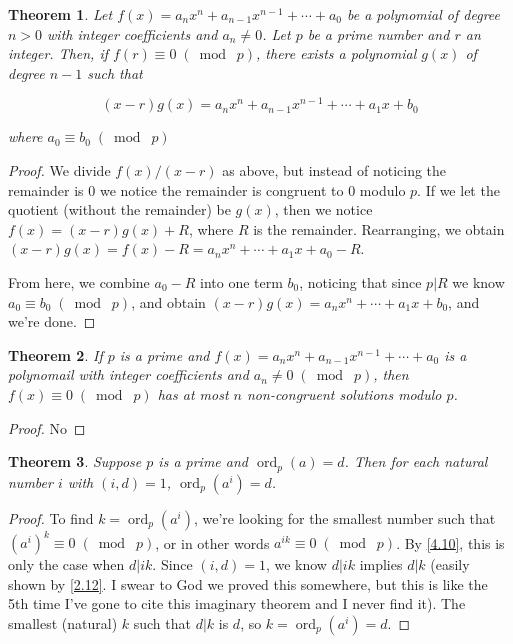 \documentclass{article}
\DeclareMathOperator{\ord}{ord}
\newtheorem{thm}{Theorem}[section]
\numberwithin{equation}{thm}
\providecommand{\gmod}[1]{\; (\bmod \; #1)}
\begin{document}
\begin{thm} \label{6.2}
  Let $f(x) = a_n x^n + a_{n-1} x^{n-1} + \cdots + a_0$ be a polynomial of degree $n > 0$ with integer coefficients and $a_n \neq 0$. Let $p$ be a prime number and $r$ an integer. Then, if $f(r) \equiv 0 \gmod p$, there exists a polynomial $g(x)$ of degree $n-1$ such that

  $$(x-r)g(x) = a_nx^n + a_{n-1}x^{n-1} + \cdots + a_1x + b_0$$

  where $a_0 \equiv b_0 \gmod p$
\end{thm}

\begin{proof}
  We divide $f(x) / (x-r)$ as above, but instead of noticing the remainder is $0$ we notice the remainder is congruent to $0$ modulo $p$. If we let the quotient (without the remainder) be $g(x)$, then we notice $f(x) = (x-r) g(x) + R$, where $R$ is the remainder. Rearranging, we obtain $(x-r) g(x) = f(x) - R = a_n x^n + \cdots + a_1 x + a_0 - R$.

  From here, we combine $a_0 - R$ into one term $b_0$, noticing that since $p | R$ we know $a_0 \equiv b_0 \gmod p$, and obtain $(x-r) g(x) = a_n x^n + \cdots + a_1 x + b_0$, and we're done.
\end{proof}



\begin{thm} \label{6.3}
  If $p$ is a prime and $f(x) = a_n x^n + a_{n-1} x^{n-1} + \cdots + a_0$ is a polynomail with integer coefficients and $a_n \neq 0 \gmod p$, then $f(x) \equiv 0 \gmod p$ has at most $n$ non-congruent solutions modulo $p$.
\end{thm}

\begin{proof}
  No
\end{proof}



\begin{thm} \label{6.4}
  Suppose $p$ is a prime and $\ord_p (a) = d$. Then for each natural number $i$ with $(i, d) = 1$, $\ord_p(a^i) = d$.
\end{thm}

\begin{proof}
  To find $k = \ord_p (a^i)$, we're looking for the smallest number such that $(a^i)^k \equiv 0 \gmod p$, or in other words $a^{ik} \equiv 0 \gmod p$. By \ref{4.10}, this is only the case when $d | ik$. Since $(i, d) = 1$, we know $d | ik$ implies $d | k$ (easily shown by \ref{2.12}. I swear to God we proved this somewhere, but this is like the 5th time I've gone to cite this imaginary theorem and I never find it). The smallest (natural) $k$ such that $d | k$ is $d$, so $k = \ord_p (a^i) = d$.
\end{proof}
\end{document}

